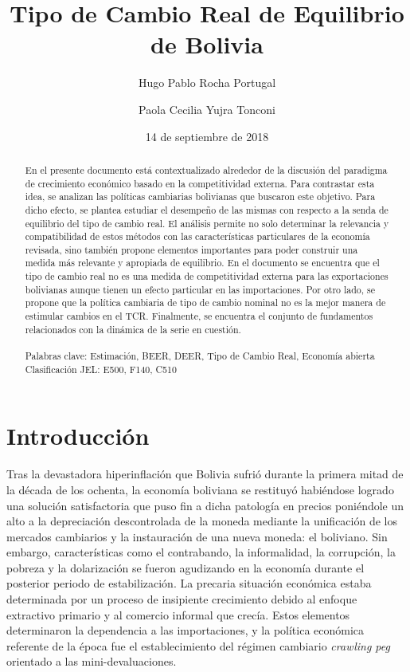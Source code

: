 \documentclass[12pt,letterpaper]{article}
\title{Tipo de Cambio Real de Equilibrio de Bolivia}
\author{Hugo Pablo Rocha Portugal \and Paola Cecilia Yujra Tonconi}
\date{14 de septiembre de 2018}
\begin{document}
 

\maketitle 

\begin{abstract}
\singlespacing

En el presente documento está contextualizado alrededor de la discusión del paradigma de crecimiento económico basado en la competitividad externa. Para contrastar esta idea, se analizan las políticas cambiarias bolivianas que buscaron este objetivo. Para dicho efecto, se plantea estudiar el desempeño de las mismas con respecto a la senda de equilibrio del tipo de cambio real. El análisis permite no solo determinar la relevancia y compatibilidad de estos métodos con las características particulares de la economía revisada, sino también propone elementos importantes para poder construir una medida más relevante y apropiada de equilibrio. En el documento se encuentra que el tipo de cambio real no es una medida de competitividad externa para las exportaciones bolivianas aunque tienen un efecto particular en las importaciones. Por otro lado, se propone que la política cambiaria de tipo de cambio nominal no es la mejor manera de estimular cambios en el TCR. Finalmente, se encuentra el conjunto de fundamentos relacionados con la dinámica de la serie en cuestión.
\\
\\
\bigskip
Palabras clave: Estimación, BEER, DEER, Tipo de Cambio Real, Economía abierta \\
Clasificación JEL: E500, F140, C510

\end{abstract}

\newpage

\section{Introducción}

Tras la devastadora hiperinflación que Bolivia sufrió durante la primera mitad de la década de los ochenta, la economía boliviana se restituyó habiéndose logrado una solución satisfactoria que puso fin a dicha patología en precios poniéndole un alto a la depreciación descontrolada de la moneda mediante la unificación de los mercados cambiarios y la instauración de una nueva moneda: el boliviano. Sin embargo, características como el contrabando, la informalidad, la corrupción, la pobreza y la dolarización se fueron agudizando en la economía durante el posterior periodo de estabilización. La precaria situación económica estaba determinada por un proceso de insipiente crecimiento debido al enfoque extractivo primario y al comercio informal que crecía. Estos elementos determinaron la dependencia a las importaciones, y la política económica referente de la época fue el establecimiento del régimen cambiario \emph{crawling peg} orientado a las mini-devaluaciones. 
\end{document}
